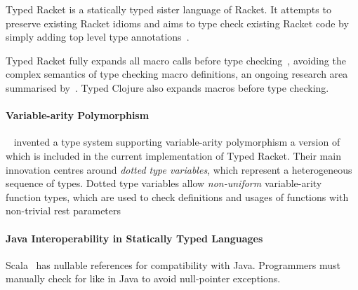 Typed Racket is a statically typed sister language of Racket. It
attempts to preserve existing Racket idioms and aims to type check
existing Racket code by simply adding top level type annotations~\cite{Tob10}.

Typed Racket fully expands all macro calls before type checking~\cite{Tob10},
avoiding the complex semantics of type checking macro definitions, an ongoing research area summarised
by~\citet{Her10}. Typed Clojure also expands macros before type checking.

\paragraph{Variable-arity Polymorphism}

~\citet{STF09} invented a type system supporting variable-arity polymorphism  %
a version of which is included in the current implementation of Typed Racket.
Their main innovation centres around \emph{dotted type variables}, which represent a heterogeneous sequence
of types. Dotted type variables allow \emph{non-uniform} variable-arity function types,
which are used to check definitions and usages of functions with non-trivial rest parameters

\paragraph{Java Interoperability in Statically Typed Languages}

Scala~\cite{OCD+} has nullable references for compatibility with Java.
Programmers must manually check for
 like in Java to avoid null-pointer exceptions. 

% 
%
